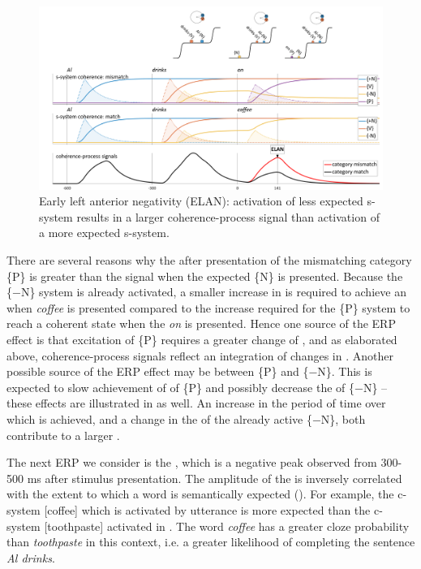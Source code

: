   
\begin{figure}
\includegraphics[width=\textwidth]{figures/Tilsen-img142.png}
\caption{Early left anterior negativity (ELAN): activation of less expected s-sys\-tem results in a larger coherence-process signal than activation of a more expected s-sys\-tem.}
\label{fig:6:23}
\end{figure}
 

There are several reasons why the  after presentation of the mismatching category \{P\} is greater than the signal when the expected \{N\} is presented. Because the \{−N\} system is already activated, a smaller increase in  is required to achieve an  when \textit{coffee} is presented compared to the increase required for the \{P\} system to reach a coherent state when the  \textit{on} is presented. Hence one source of the ERP effect is that excitation of \{P\} requires a greater change of , and as elaborated above, coherence-process signals reflect an integration of changes in . Another possible source of the ERP effect may be  between \{P\} and \{−N\}. This  is expected to slow achievement of  of \{P\} and possibly decrease the  of \{−N\} -- these effects are illustrated in {} as well. An increase in the period of time over which  is achieved, and a change in the  of the already active \{−N\}, both contribute to a larger .

  The next ERP we consider is the , which is a negative peak observed from 300-500 ms after stimulus presentation. The amplitude of the  is inversely correlated with the extent to which a word is semantically expected (\citealt{FedermeierLaszlo2009,Friederici2002,KutasFedermeier2011}). For example, the c-sys\-tem [coffee] which is activated by utterance  is more expected than the c-sys\-tem [toothpaste] activated in . The word \textit{coffee} has a greater cloze probability than \textit{toothpaste} in this context, i.e. a greater likelihood of completing the sentence \textit{Al drinks}.

